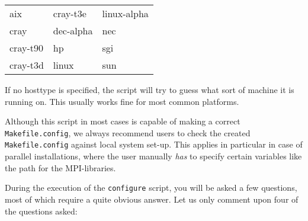 \bigskip

\begin{tabular}{lll}
aix \hspace{3cm} & cray-t3e \hspace{3cm} & linux-alpha\\
cray             & dec-alpha             & nec\\
cray-t90         & hp                    & sgi\\
cray-t3d         & linux                 & sun\\
\end{tabular}

\bigskip

If no hosttype is specified, the script will try to guess what sort of
machine it is running on. This usually works fine for most common
platforms.

Although this script in most cases is capable of making a correct
\verb|Makefile.config|, we always recommend users to check the created
\verb|Makefile.config| against local system set-up. This applies in
particular in case of parallel installations, where the user manually
{\em has} to specify certain variables like the path for the
MPI-libraries.

During the execution of the \verb|configure| script, you will be
asked a few questions, most of which require a quite obvious
answer. Let us only comment upon four of the questions asked:

